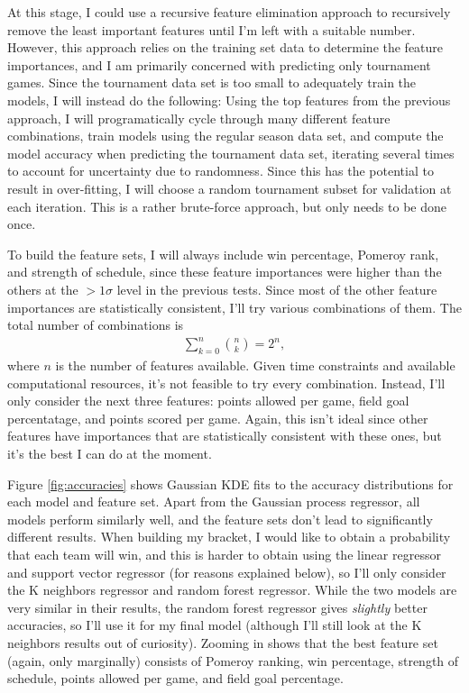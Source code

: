 \documentclass[twocolumn]{aastex63}
\begin{document}
At this stage, I could use a recursive feature elimination approach to recursively remove the least important features until I'm left with a suitable number.
However, this approach relies on the training set data to determine the feature importances, and I am primarily concerned with predicting only tournament games.
Since the tournament data set is too small to adequately train the models, I will instead do the following:
Using the top features from the previous approach, I will programatically cycle through many different feature combinations, train models using the regular season data set, and compute the model accuracy when predicting the tournament data set, iterating several times to account for uncertainty due to randomness.
Since this has the potential to result in over-fitting, I will choose a random tournament subset for validation at each iteration.
This is a rather brute-force approach, but only needs to be done once.

To build the feature sets, I will always include win percentage, Pomeroy rank, and strength of schedule, since these feature importances were higher than the others at the $>1\sigma$ level in the previous tests.
Since most of the other feature importances are statistically consistent, I'll try various combinations of them.
The total number of combinations is
\begin{align}
\sum_{k=0}^n \binom{n}{k} = 2^n,
\end{align}
where $n$ is the number of features available.
Given time constraints and available computational resources, it's not feasible to try every combination.
Instead, I'll only consider the next three features: points allowed per game, field goal percentatage, and points scored per game.
Again, this isn't ideal since other features have importances that are statistically consistent with these ones, but it's the best I can do at the moment.

Figure \ref{fig:accuracies} shows Gaussian KDE fits to the accuracy distributions for each model and feature set.
Apart from the Gaussian process regressor, all models perform similarly well, and the feature sets don't lead to significantly different results.
When building my bracket, I would like to obtain a probability that each team will win, and this is harder to obtain using the linear regressor and support vector regressor (for reasons explained below), so I'll only consider the K neighbors regressor and random forest regressor.
While the two models are very similar in their results, the random forest regressor gives \textit{slightly} better accuracies, so I'll use it for my final model (although I'll still look at the K neighbors results out of curiosity).
Zooming in shows that the best feature set (again, only marginally) consists of Pomeroy ranking, win percentage, strength of schedule, points allowed per game, and field goal percentage.
\end{document}
